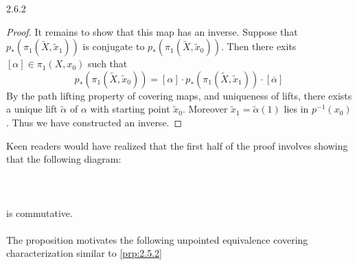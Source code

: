 \documentclass[a4paper]{article}
\begin{document}
\begin{prp}{}{2.6.2}
\begin{proof}
It remains to show that this map has an inverse. Suppose that $p_\ast(\pi_1(\tilde{X},\tilde{x}_1))$ is conjugate to $p_\ast(\pi_1(\tilde{X},\tilde{x}_0))$. Then there exits $[\alpha]\in\pi_1(X,x_0)$ such that $$p_\ast(\pi_1(\tilde{X},\tilde{x}_0))=[\alpha]\cdot p_\ast(\pi_1(\tilde{X},\tilde{x}_1))\cdot[\overline{\alpha}]$$ By the path lifting property of covering maps, and uniqueness of lifts, there exists a unique lift $\tilde{\alpha}$ of $\alpha$ with starting point $\tilde{x}_0$. Moreover $\tilde{x}_1=\tilde{\alpha}(1)$ lies in $p^{-1}(x_0)$. Thus we have constructed an inverse. 
\end{proof}
\end{prp}

Keen readers would have realized that the first half of the proof involves showing that the following diagram: \\~\\
\\~\\ 
is commutative. \\~\\

The proposition motivates the following unpointed equivalence covering characterization similar to \ref{prp:2.5.2}
\end{document}
